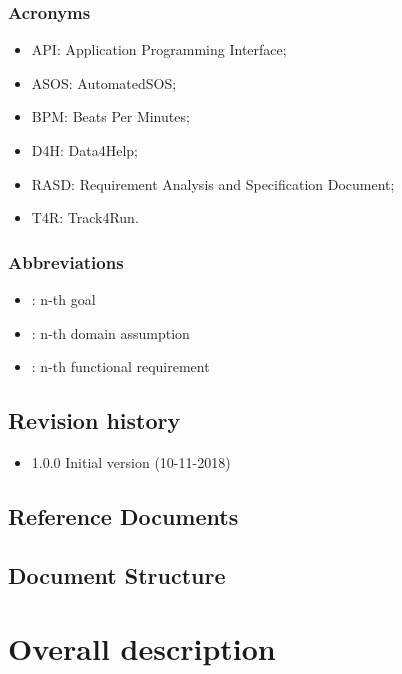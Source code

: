\documentclass{article}
\begin{document}
\subsubsection{Acronyms}
\begin{itemize}
\item API: Application Programming Interface;
\item ASOS: AutomatedSOS;
\item BPM: Beats Per Minutes;
\item D4H: Data4Help;
\item RASD: Requirement Analysis and Specification Document;
\item T4R: Track4Run.
\end{itemize}

\subsubsection{Abbreviations}
\begin{itemize}
		\item \begin{math}[Gn]\end{math}: n-th goal
		\item \begin{math}[Dn]\end{math}: n-th domain assumption 
		\item \begin{math}[Rn]\end{math}: n-th functional requirement
\end{itemize}

\subsection{Revision history}
\begin{itemize}
	\item 1.0.0 Initial version (10-11-2018)
\end{itemize}
\subsection{Reference Documents}
\subsection{Document Structure}
\newpage
\section{Overall description}
\end{document}
